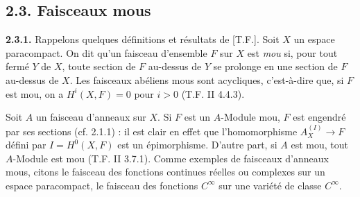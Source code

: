 \documentclass[11pt]{article}
\begin{document}
\subsection*{2.3. Faisceaux mous}

\textbf{2.3.1.} Rappelons quelques définitions et résultats de [T.F.]. Soit $X$ un espace paracompact. On dit qu'un faisceau d'ensemble $F$ sur $X$ est \emph{mou} si, pour tout fermé $Y$ de $X$, toute section de $F$ au-dessus de $Y$ se prolonge en une section de $F$ au-dessus de $X$. Les faisceaux abéliens mous sont acycliques, c'est-à-dire que, si $F$ est mou, on a $H^i(X,F)=0$ pour $i>0$ (T.F. II 4.4.3).

Soit $A$ un faisceau d'anneaux sur $X$. Si $F$ est un $A$-Module mou, $F$ est engendré par ses sections (cf. 2.1.1) : il est clair en effet que l'homomorphisme $A_X^{(I)}\to F$ défini par $I=H^0(X,F)$ est un épimorphisme. D'autre part, si $A$ est mou, tout $A$-Module est mou (T.F. II 3.7.1). Comme exemples de faisceaux d'anneaux mous, citons le faisceau des fonctions continues réelles ou complexes sur un espace paracompact, le faisceau des fonctions $C^\infty$ sur une variété de classe $C^\infty$.
\end{document}
